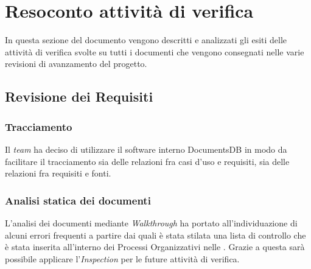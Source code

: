 \newpage
\section{Resoconto attività di verifica}
In questa sezione del documento vengono descritti e analizzati gli esiti delle attività di verifica svolte su tutti i documenti che vengono consegnati nelle varie revisioni di avanzamento del progetto.

\subsection{Revisione dei Requisiti}

\subsubsection{Tracciamento}
Il \textit{team} ha deciso di utilizzare il software interno DocumentsDB in modo da facilitare il tracciamento sia delle relazioni fra casi d'uso e requisiti, sia delle relazioni fra requisiti e fonti.

\subsubsection{Analisi statica dei documenti}
L'analisi dei documenti mediante \textit{Walkthrough} ha portato all'individuazione di alcuni errori frequenti a partire dai quali è stata stilata una lista di controllo che è stata inserita all'interno dei Processi Organizzativi nelle \textit{\NdP}. Grazie a questa sarà possibile applicare l'\textit{Inspection} per le future attività di verifica.

